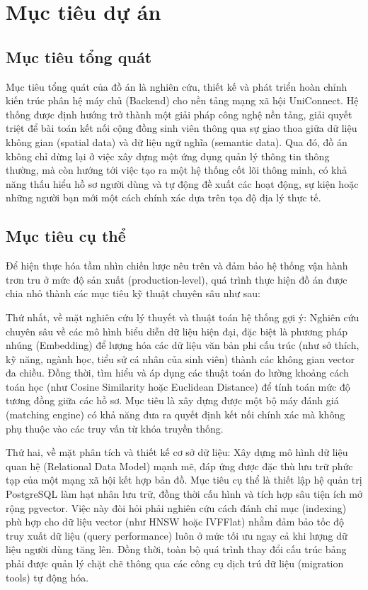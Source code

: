 \section{Mục tiêu dự án}
\subsection{Mục tiêu tổng quát}

Mục tiêu tổng quát của đồ án là nghiên cứu, thiết kế và phát triển hoàn chỉnh kiến trúc phân hệ máy chủ (Backend) cho nền tảng mạng xã hội UniConnect. Hệ thống được định hướng trở thành một giải pháp công nghệ nền tảng, giải quyết triệt để bài toán kết nối cộng đồng sinh viên thông qua sự giao thoa giữa dữ liệu không gian (spatial data) và dữ liệu ngữ nghĩa (semantic data). Qua đó, đồ án không chỉ dừng lại ở việc xây dựng một ứng dụng quản lý thông tin thông thường, mà còn hướng tới việc tạo ra một hệ thống cốt lõi thông minh, có khả năng thấu hiểu hồ sơ người dùng và tự động đề xuất các hoạt động, sự kiện hoặc những người bạn mới một cách chính xác dựa trên tọa độ địa lý thực tế.

\subsection{Mục tiêu cụ thể}

Để hiện thực hóa tầm nhìn chiến lược nêu trên và đảm bảo hệ thống vận hành trơn tru ở mức độ sản xuất (production-level), quá trình thực hiện đồ án được chia nhỏ thành các mục tiêu kỹ thuật chuyên sâu như sau:

Thứ nhất, về mặt nghiên cứu lý thuyết và thuật toán hệ thống gợi ý:
Nghiên cứu chuyên sâu về các mô hình biểu diễn dữ liệu hiện đại, đặc biệt là phương pháp nhúng (Embedding) để lượng hóa các dữ liệu văn bản phi cấu trúc (như sở thích, kỹ năng, ngành học, tiểu sử cá nhân của sinh viên) thành các không gian vector đa chiều. Đồng thời, tìm hiểu và áp dụng các thuật toán đo lường khoảng cách toán học (như Cosine Similarity hoặc Euclidean Distance) để tính toán mức độ tương đồng giữa các hồ sơ. Mục tiêu là xây dựng được một bộ máy đánh giá (matching engine) có khả năng đưa ra quyết định kết nối chính xác mà không phụ thuộc vào các truy vấn từ khóa truyền thống\cite{mikolov2013efficient}.

Thứ hai, về mặt phân tích và thiết kế cơ sở dữ liệu:
Xây dựng mô hình dữ liệu quan hệ (Relational Data Model) mạnh mẽ, đáp ứng được đặc thù lưu trữ phức tạp của một mạng xã hội kết hợp bản đồ. Mục tiêu cụ thể là thiết lập hệ quản trị PostgreSQL làm hạt nhân lưu trữ, đồng thời cấu hình và tích hợp sâu tiện ích mở rộng pgvector. Việc này đòi hỏi phải nghiên cứu cách đánh chỉ mục (indexing) phù hợp cho dữ liệu vector (như HNSW hoặc IVFFlat) nhằm đảm bảo tốc độ truy xuất dữ liệu (query performance) luôn ở mức tối ưu ngay cả khi lượng dữ liệu người dùng tăng lên. Đồng thời, toàn bộ quá trình thay đổi cấu trúc bảng phải được quản lý chặt chẽ thông qua các công cụ dịch trú dữ liệu (migration tools) tự động hóa\cite{malkov2018efficient}.

